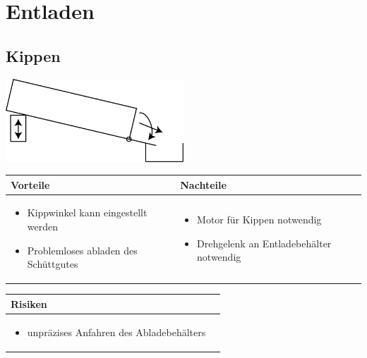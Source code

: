 
\section{Entladen}


\subsection{Kippen}

\includegraphics[width=0.5\textwidth]{fig/Entladen_Kippen.png}

\begin{table}[h]
\begin{tabular}{p{} | p{}}


 \textbf{Vorteile} & \textbf{Nachteile} \\ \hline
	 
\begin{itemize}
\item Kippwinkel kann eingestellt werden
\item Problemloses abladen des Schüttgutes
\end{itemize}

 
 &
 
\begin{itemize}
\item Motor für Kippen notwendig
\item Drehgelenk an Entladebehälter notwendig
\end{itemize}

\end{tabular}
\end{table}

\begin{table}[h]
\begin{tabular}{p{}p{}}


 \textbf{Risiken} & \\ \hline
	 
\begin{itemize}
\item unpräzises Anfahren des Abladebehälters
\end{itemize}

 
\end{tabular}
\end{table}

